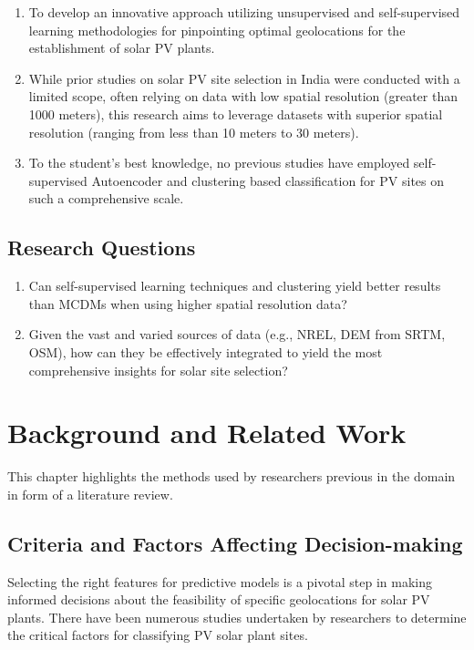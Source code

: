 \documentclass[a4paper,12pt]{Classes/RoboticsLaTeX}
\begin{document}
	\begin{enumerate}
		\item To develop an innovative approach utilizing unsupervised and self-supervised learning methodologies for pinpointing optimal geolocations for the establishment of solar PV plants.
		
		\item While prior studies on solar PV site selection in India were conducted with a limited scope, often relying on data with low spatial resolution (greater than 1000 meters), this research aims to leverage datasets with superior spatial resolution (ranging from less than 10 meters to 30 meters).
		
		\item To the student's best knowledge, no previous studies have employed self-supervised Autoencoder and clustering based classification for \ac{PV} sites on such a comprehensive scale.
	\end{enumerate}

	\section{Research Questions}

	\begin{enumerate}
		\item Can self-supervised learning techniques and clustering yield better results than \ac{MCDMs} when using higher spatial resolution data?
		\item Given the vast and varied sources of data (e.g., \ac{NREL}, \ac{DEM} from \ac{SRTM}, \ac{OSM}), how can they be effectively integrated to yield the most comprehensive insights for solar site selection?
	\end{enumerate}

	\chapter{Background and Related Work}

	This chapter highlights the methods used by researchers previous in the domain in form of a literature review.
	
	\section{Criteria and Factors Affecting Decision-making}

	Selecting the right features for predictive models is a pivotal step in making informed decisions about the feasibility of specific geolocations for solar \ac{PV} plants. There have been numerous studies undertaken by researchers to determine the critical factors for classifying \ac{PV} solar plant sites.
\end{document}

